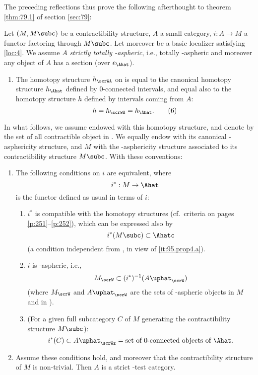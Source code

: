 The preceding reflections thus prove the following
afterthought to theorem \ref{thm:79.1} of section \ref{sec:79}:
\begin{propositionnum}\label{prop:95.4}
  Let $(M,M\subc)$ be a contractibility structure, $A$ a small
  category, $i:A\to M$ a functor factoring through $M\subc$. Let
  moreover \scrW{} be a basic localizer satisfying
  \textup{\ref{loc:4}}. We assume $A$ \emph{strictly totally
    \scrW-aspheric}, i.e., totally \scrW-aspheric and moreover any
  object of $A$ has a section \textup(over $e_\Ahat$\textup).
  \begin{enumerate}[label=\alph*),font=\normalfont]
  \item\label{it:95.prop4.a}
    The homotopy structure $h_\scrWA$ on \Ahat{} is equal to the
    canonical homotopy structure $h_\Ahat$ defined by $0$-connected
    intervals, and equal also to the homotopy structure $h$ defined by
    intervals coming from $A$:
    \begin{equation}
      \label{eq:95.6}
      h=h_\scrWA=h_\Ahat.\tag{6}
    \end{equation}
  \end{enumerate}
  In what follows, we assume \Ahat{} endowed with this homotopy
  structure, and denote by \Ahatc{} the set of all contractible object
  in \Ahat. We equally endow \Ahat{} with its canonical
  \scrW-asphericity structure, and $M$ with the \scrW-asphericity
  structure associated to its contractibility structure $M\subc$. With
  these conventions:
  \begin{enumerate}[label=\alph*),font=\normalfont,start=2]
  \item\label{it:95.prop4.b}
    The following conditions on $i$ are equivalent, where
    \[i^*:M\to\Ahat\]
    is the functor defined as usual in terms of $i$:
    \begin{enumerate}[label=(\roman*),font=\normalfont]
    \item\label{it:95.prop4.b.i}
      $i^*$ is compatible with the homotopy structures \textup(cf.\
      criteria on pages \ref{p:251}--\ref{p:252}\textup), which can be
      expressed also by
      \[i^*(M\subc)\subset\Ahatc\]
      \textup(a condition independent from \scrW, in view of
      \textup{\ref{it:95.prop4.a})}.
    \item\label{it:95.prop4.b.ii}
      $i$ is \scrW-aspheric, i.e.,
      \[M_\scrW \subset (i^*)^{-1}(A\uphat_\scrW)\]
      \textup(where $M_\scrW$ and $A\uphat_\scrW$ are the sets of
      \scrW-aspheric objects in $M$ and in \Ahat\textup).
    \item\label{it:95.prop4.b.iii}
      \textup(For a given full subcategory $C$ of $M$ generating the
      contractibility structure $M\subc$\textup):
      \[i^*(C)\subset A\uphat_\scrWz = \text{set of $0$-connected
        objects of \Ahat.}\]
    \end{enumerate}
  \item\label{it:95.prop4.c}
    Assume these conditions hold, and moreover that the
    contractibility structure of $M$ is non-trivial. Then $A$ is a
    strict \scrW-test category.
  \end{enumerate}
\end{propositionnum}
